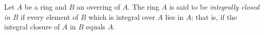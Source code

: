Let $A$ be a ring and $B$ an overring of $A$. The ring $A$ is said to be \emph{integrally closed in $B$} if every element of $B$ which is integral over $A$ lies in $A$; that is, if the integral closure of $A$ in $B$ equals $A$.
